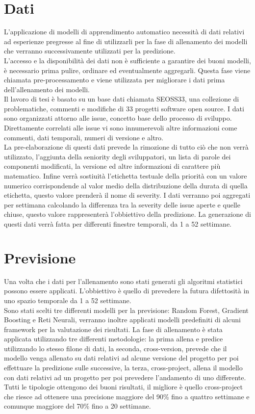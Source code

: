 \documentclass{article}
\begin{document}
\section{Dati}
L'applicazione di modelli di apprendimento automatico necessità di dati relativi ad esperienze pregresse al fine di utilizzarli per la fase di allenamento dei modelli che verranno successivamente utilizzati per la predizione.\\
L'accesso e la disponibilità dei dati non è sufficiente a garantire dei buoni modelli, è necessario prima pulire, ordinare ed eventualmente aggregarli. Questa fase viene chiamata pre-processamento e viene utilizzata per migliorare i dati prima dell'allenamento dei modelli.\\
Il lavoro di tesi è basato su un base dati chiamata SEOSS33, una collezione di problematiche, commenti e modifiche di 33 progetti software open source. I dati sono organizzati attorno alle issue, concetto base dello processo di sviluppo. Direttamente correlati alle issue vi sono innumerevoli altre informazioni come commenti, dati temporali, numeri di versione e altro.\\
La pre-elaborazione di questi dati prevede la rimozione di tutto ciò che non verrà utilizzato, l'aggiunta della seniority degli sviluppatori, un lista di parole dei componenti modificati, la versione ed altre informazioni di carattere più matematico. Infine verrà sostiuità l'etichetta testuale della priorità con un valore numerico corrispondende al valor medio della distribuzione della durata di quella etichetta, questo valore prenderà il nome di severity. I dati verranno poi aggregati per settimana calcolando la differenza tra la severity delle issue aperte e quelle chiuse, questo valore rappresenterà l'obbiettivo della predizione. La generazione di questi dati verrà fatta per differenti finestre temporali, da 1 a 52 settimane.

\section{Previsione}
Una volta che i dati per l'allenamento sono stati generati gli algoritmi statistici possono essere applicati. L'obbiettivo è quello di prevedere la futura difettosità in uno spazio temporale da 1 a 52 settimane.\\
Sono stati scelti tre differenti modelli per la previsione: Random Forest, Gradient Boosting e Reti Neurali, verranno inoltre applicati modelli predefiniti di alcuni framework per la valutazione dei risultati. La fase di allenamento è stata applicata utilizzando tre differenti metodologie: la prima allena e predice utilizzando lo stesso filone di dati, la seconda, cross-version, prevede che il modello venga allenato su dati relativi ad alcune versione del progetto per poi effettuare la predizione sulle successive, la terza, cross-project, allena il modello con dati relativi ad un progetto per poi prevedere l'andamento di uno differente.\\
Tutti le tipologie ottengono dei buoni risultati, il migliore è quello cross-project che riesce ad ottenere una precisione maggiore del 90\% fino a quattro settimane e comunque maggiore del 70\% fino a 20 settimane. 
\end{document}
